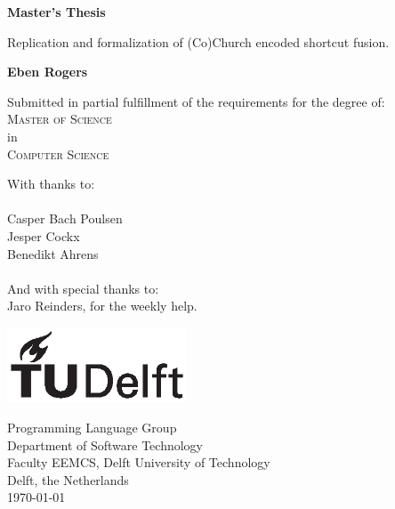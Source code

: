 \newcommand{\thetitle}{Master's Thesis}
\newcommand{\thesubtitle}{Replication and formalization of (Co)Church encoded shortcut fusion.}
\newcommand{\thename}{Eben Rogers}
\begin{titlepage}
\begin{adjustwidth}{-1cm}{-1cm}
    \begin{center}
        \vspace*{1cm}
            
        \Huge
        \textbf{\thetitle}
        \vspace{0.5cm}
        \LARGE

        \thesubtitle
            
        \vspace{1.5cm}
        \textbf{\thename}

        \vspace{0.8cm}
            
        \large
        Submitted in partial fulfillment of the requirements for the degree of:\\
        \LARGE
        \textsc{Master of Science}\\
        \Large
        in\\
        \LARGE
        \textsc{Computer Science}\\

        \vspace{0.8cm}

        \large
        With thanks to:\\~\\
        Casper Bach Poulsen \\
        Jesper Cockx\\
        Benedikt Ahrens\\~\\
        And with special thanks to:\\
        Jaro Reinders, for the weekly help.
        
        \vfill
        \includegraphics[width=0.4\textwidth]{figures/tudelft_logo_bw}
            
        \Large
        Programming Language Group \\
        Department of Software Technology \\
        Faculty EEMCS, Delft University of Technology \\
        Delft, the Netherlands \\
        \today
            
    \end{center}
\end{adjustwidth}
\end{titlepage}
